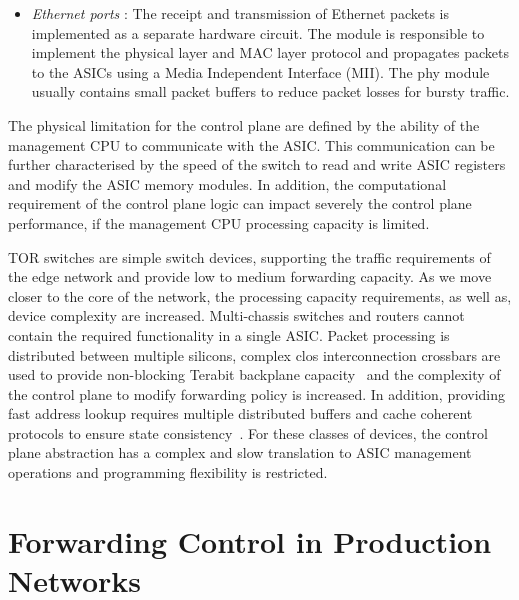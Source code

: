 \begin{itemize}
  \item \emph{Ethernet ports} : The receipt and transmission of Ethernet packets
        is implemented as a separate hardware circuit. The module is responsible
        to implement the physical layer and MAC layer protocol and propagates
        packets to the ASICs using a  Media Independent Interface (MII).  The
        phy module  usually contains small packet buffers to reduce packet
        losses for bursty traffic.  
\end{itemize}

The physical limitation for the control plane are defined by the ability of the
management CPU to communicate with the ASIC. This communication can be further
characterised by the speed of the switch to read and write ASIC registers and
modify the ASIC memory modules. In addition, the computational requirement of
the control plane logic can impact severely the control plane performance, if
the management CPU processing capacity is limited. 

TOR switches are simple switch devices,  supporting the traffic requirements of
the edge network and provide low to medium forwarding capacity. As we move
closer to the core of the network, the processing capacity requirements, as well
as, device complexity are increased. Multi-chassis switches and routers cannot
contain the required functionality in a single ASIC. Packet processing is
distributed between multiple silicons, complex clos interconnection crossbars
are used to provide non-blocking Terabit backplane
capacity~\cite{juniper_t_series} and the complexity of the control plane to
modify forwarding policy is increased. In addition, providing fast address
lookup requires multiple distributed buffers and cache coherent protocols to
ensure state consistency~\cite{cisco_cef}. For these classes of devices, the
control plane abstraction has a complex and slow translation to ASIC management
operations and programming flexibility is restricted.  


\section{Forwarding Control in Production Networks} \label{sec:background:netcontrol}

